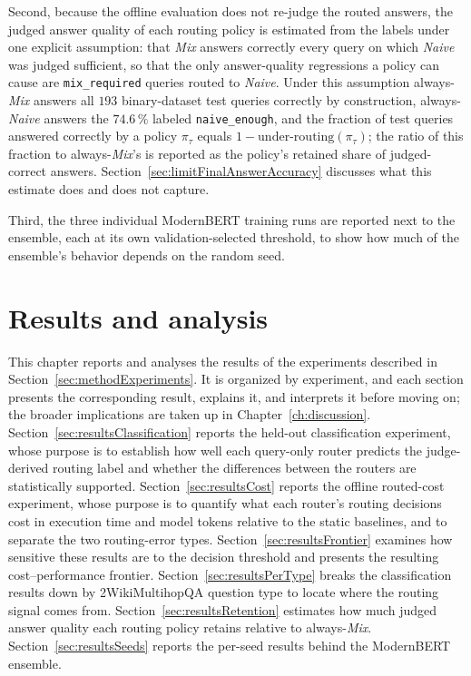 \documentclass[english, bibtex]{kththesis}               %
\numberwithin{listing}{chapter}
\begin{document}
Second, because the offline evaluation does not re-judge the routed answers, the judged answer quality of each routing policy is estimated from the labels under one explicit assumption: that \emph{Mix} answers correctly every query on which \emph{Naive} was judged sufficient, so that the only answer-quality regressions a policy can cause are \texttt{mix\_required} queries routed to \emph{Naive}. Under this assumption always-\emph{Mix} answers all $193$ binary-dataset test queries correctly by construction, always-\emph{Naive} answers the $74.6\,\%$ labeled \texttt{naive\_enough}, and the fraction of test queries answered correctly by a policy $\pi_\tau$ equals $1 - \mathrm{under\text{-}routing}(\pi_\tau)$; the ratio of this fraction to always-\emph{Mix}'s is reported as the policy's retained share of judged-correct answers. Section~\ref{sec:limitFinalAnswerAccuracy} discusses what this estimate does and does not capture.

Third, the three individual ModernBERT training runs are reported next to the ensemble, each at its own validation-selected threshold, to show how much of the ensemble's behavior depends on the random seed.

\cleardoublepage
\chapter{Results and analysis}
\label{ch:results}

This chapter reports and analyses the results of the experiments described in Section~\ref{sec:methodExperiments}. It is organized by experiment, and each section presents the corresponding result, explains it, and interprets it before moving on; the broader implications are taken up in Chapter~\ref{ch:discussion}. Section~\ref{sec:resultsClassification} reports the held-out classification experiment, whose purpose is to establish how well each query-only router predicts the judge-derived routing label and whether the differences between the routers are statistically supported. Section~\ref{sec:resultsCost} reports the offline routed-cost experiment, whose purpose is to quantify what each router's routing decisions cost in execution time and model tokens relative to the static baselines, and to separate the two routing-error types. Section~\ref{sec:resultsFrontier} examines how sensitive these results are to the decision threshold and presents the resulting cost--performance frontier. Section~\ref{sec:resultsPerType} breaks the classification results down by 2WikiMultihopQA question type to locate where the routing signal comes from. Section~\ref{sec:resultsRetention} estimates how much judged answer quality each routing policy retains relative to always-\emph{Mix}. Section~\ref{sec:resultsSeeds} reports the per-seed results behind the ModernBERT ensemble.
\end{document}
